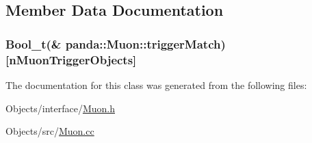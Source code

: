 \subsection{Member Data Documentation}
\hypertarget{classpanda_1_1Muon_a30e551a04615de2f3d634cf7314f60ea}{
\subsubsection[{triggerMatch}]{\setlength{\rightskip}{0pt plus 5cm}Bool\_\-t(\& {\bf panda::Muon::triggerMatch})\mbox{[}nMuonTriggerObjects\mbox{]}}}
\label{classpanda_1_1Muon_a30e551a04615de2f3d634cf7314f60ea}


The documentation for this class was generated from the following files:\begin{DoxyCompactItemize}
\item 
Objects/interface/\hyperlink{Muon_8h}{Muon.h}\item 
Objects/src/\hyperlink{Muon_8cc}{Muon.cc}\end{DoxyCompactItemize}
